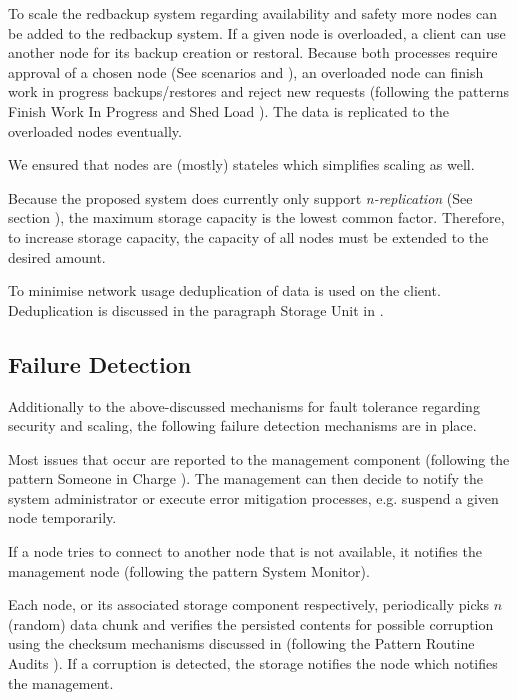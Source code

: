 To scale the redbackup system regarding availability and safety more \glspl{node} can be added to the redbackup system. If a given \gls{node} is overloaded, a \gls{client} can use another \gls{node} for its backup creation or restoral. Because both processes require approval of a chosen \gls{node} (See scenarios  and ), an overloaded \gls{node} can finish work in progress backups/restores and reject new requests (following the patterns Finish Work In Progress and Shed Load \cite{fault-tolerance}). The data is replicated to the overloaded \glspl{node} eventually.

We ensured that \glspl{node} are (mostly) stateles which simplifies scaling as well.

Because the proposed system does currently only support \emph{n-replication} (See section ), the maximum storage capacity is the lowest common factor. Therefore, to increase storage capacity, the capacity of all \glspl{node} must be extended to the desired amount.

To minimise network usage deduplication of data is used on the \gls{client}. Deduplication is  discussed in the paragraph Storage Unit in  .

\subsection{Failure Detection}

Additionally to the above-discussed mechanisms for fault tolerance regarding security and scaling, the following failure detection mechanisms are in place.

Most issues that occur are reported to the \gls{management} component (following the pattern Someone in Charge \cite{fault-tolerance}). The \gls{management} can then decide to notify the system administrator or execute error mitigation processes, e.g. suspend a given \gls{node} temporarily.

If a node tries to connect to another node that is not available, it notifies the management node (following the pattern System Monitor\cite{fault-tolerance}).

Each \gls{node}, or its associated \gls{storage} component respectively, periodically picks $n$ (random) data \gls{chunk} and verifies the persisted contents for possible corruption using the checksum mechanisms discussed in  (following the Pattern Routine Audits \cite{fault-tolerance}). If a corruption is detected, the \gls{storage} notifies the \gls{node} which notifies the \gls{management}.

